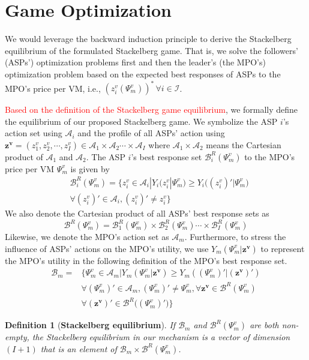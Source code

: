 \documentclass[10pt,journal, compsoc]{IEEEtran}
\newtheorem{definition}{Definition}
\begin{document}
\section{Game Optimization} \label{sec:game_optimization}
We would leverage the backward induction principle to derive the Stackelberg equilibrium of the formulated Stackelberg game. That is, we solve the followers' (ASPs') optimization problems first and then the leader's (the MPO's) optimization problem based on the expected best responses of ASPs to the MPO's price per VM, i.e., $(z_i^v(\Psi_m^v))^* \, \forall i \in \mathcal{I}$. 

\textcolor{red}{Based on the definition of the Stackelberg game equilibrium\cite{bacsar1998dynamic}}, we formally define the equilibrium of our proposed Stackelberg game. We symbolize the ASP $i$'s action set using $\mathcal{A}_i$ and the profile of all ASPs' action using $\bm{z^v}=(z_1^v, z_2^v, \cdots, z_I^v) \in \mathcal{A}_1 \times \mathcal{A}_2 \cdots \times \mathcal{A}_I$ where $\mathcal{A}_1 \times \mathcal{A}_2$ means the Cartesian product of $\mathcal{A}_1$ and $\mathcal{A}_2$. The ASP $i$'s best response set $\mathcal{B}_i^R(\Psi_m^v)$ to the MPO's price per VM $\Psi_m^v$ is given by
\begin{equation} \label{eqn:asp_best_response}
\begin{aligned}
&\mathcal{B}_i^R(\Psi_m^v) = \{z_i^v \in \mathcal{A}_i |Y_i(z_i^v|\Psi_m^v) \geq Y_i\big((z_i^v)'|\Psi_m^v\big) \\
&\forall (z_i^v)' \in \mathcal{A}_i, (z_i^v)' \neq z_i^v\}
\end{aligned}
\end{equation}
We also denote the Cartesian product of all ASPs' best response sets as
\begin{equation}
\mathcal{B}^R(\Psi_m^v) = \mathcal{B}_1^R(\Psi_m^v) \times \mathcal{B}_2^R(\Psi_m^v) \cdots \times \mathcal{B}_I^R(\Psi_m^v)
\end{equation}
Likewise, we denote the MPO's action set as $\mathcal{A}_m$. Furthermore, to stress the influence of ASPs' actions on the MPO's utility, we use $Y_m(\Psi_m^v|\bm{z^v})$ to represent the MPO's utility in the following definition of the MPO's best response set.
\begin{equation} \label{eqn:mpo_best_response}
\begin{aligned}
\mathcal{B}_m = &\{\Psi_m^v \in \mathcal{A}_m| Y_m(\Psi_m^v|\bm{z^v}) \geq Y_m((\Psi_m^v)'|(\bm{z^v})') \\
&\forall (\Psi_m^v)' \in \mathcal{A}_m, (\Psi_m^v)' \neq \Psi_m^v, \forall \bm{z^v} \in \mathcal{B}^R(\Psi_m^v) \\
&\forall  (\bm{z^v})' \in \mathcal{B}^R\big((\Psi_m^v)'\big)\}
\end{aligned}
\end{equation}
\begin{definition}[\textbf{Stackelberg equilibrium}] \label{def:stackelberg_equilibrium}
If $\mathcal{B}_{m}$ and $\mathcal{B}^R(\Psi_m^v)$ are both non-empty, the Stackelberg equilibrium in our mechanism is a vector of dimension $(I+1)$ that is an element of $\mathcal{B}_m  \times \mathcal{B}^R(\Psi_m^v)$.
\end{definition}
\end{document}
